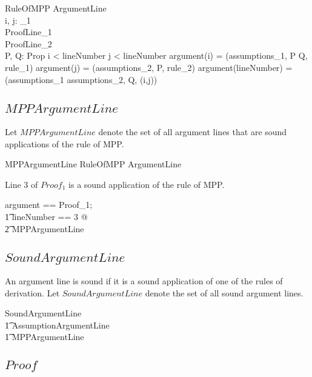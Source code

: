\documentclass[11pt, oneside]{article}
\begin{document}
\begin{schema}{RuleOfMPP}
	ArgumentLine \\
	i, j: \nat_1 \\
	ProofLine_1 \\
	ProofLine_2 \\
	P, Q: Prop
\where
	i < lineNumber \land j < lineNumber
\also
	argument(i) = (assumptions_1, P \impliesProp Q, rule_1)
\also
	argument(j) = (assumptions_2, P, rule_2)
\also
	argument(lineNumber) = (assumptions_1 \cup assumptions_2, Q, (i,j))
\end{schema}

\subsection{$MPPArgumentLine$}

Let $MPPArgumentLine$ denote the set of all argument lines that are sound applications
of the rule of MPP.

\begin{zed}
	MPPArgumentLine  RuleOfMPP \project ArgumentLine
\end{zed}

\begin{example}
Line 3 of $Proof_1$ is a sound application of the rule of MPP.

\begin{zed}
	\LET argument == Proof_1; \\
	\t1	lineNumber == 3 @ \\
	\t2		MPPArgumentLine
\end{zed}

\end{example}

\subsection{$SoundArgumentLine$}

An argument line is sound if it is a sound application of one of the rules of derivation.
Let $SoundArgumentLine$ denote the set of all sound argument lines.

\begin{zed}
	SoundArgumentLine  \\
	\t1	AssumptionArgumentLine \lor \\
	\t1	MPPArgumentLine
\end{zed}

\subsection{$Proof$}
\end{document}
